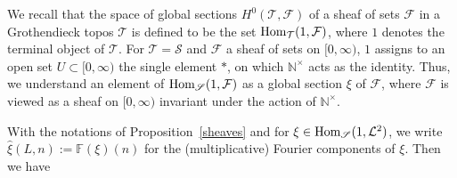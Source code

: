 \documentclass{pspum-l}
\theoremstyle{definition}
\theoremstyle{remark}
\numberwithin{equation}{section}
\def\F{{\mathbb F}}
\def\cF{{\mathcal F}}
\def\cL{{\mathcal L}}
\def\cT{{\mathcal T}}
\def\fourier{\F}
\def\Hom{{\rm Hom}}
\def\nt{\N^{\times}}
\def\N{{\mathbb N}}
\def\scal2{{\mathscr S}}
\begin{document}
 
 We recall that the space of  global sections $H^0(\cT,\cF)$ of a sheaf of sets $\cF$ in a Grothendieck topos $\cT$  is defined to be the set $\Hom_{\cT}(1,\cF)$, where $1$ denotes the terminal object of $\cT$.  For $\cT=\scal 2$ and $\cF$  a   sheaf of sets on $[0,\infty)$,  $1$ assigns to an open set $U\subset [0,\infty)$ the single element $*$, on which $\nt$ acts as the identity. Thus, we understand an element of $\Hom_{\scal2}(1,\cF)$ as  a global section $\xi$ of $\cF$, where $\cF$ is viewed as a sheaf on $[0,\infty)$  invariant under the action of $\nt$.\vspace{.05in} %
 
With the notations of Proposition~\ref{sheaves} and  for  $\xi\in\Hom_{\scal2}(1,\cL^2)$, we  write $\widehat \xi(L,n):=\fourier(\xi)(n)$ for the (multiplicative) Fourier components of $\xi$. Then we have
\end{document}
